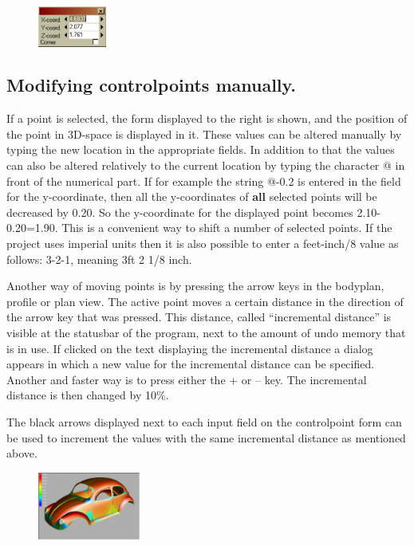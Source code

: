 \documentclass[12pt]{article}
\begin{document}
\begin{figure}
        \centering
        \includegraphics[width=0.2\textwidth,natwidth=277,natheight=165]{pointdialog.png}
        \caption{}
        \label{fig:pointdialog}
\end{figure}

\subsection{Modifying controlpoints manually.}
If a point is selected, the form displayed to the right is shown, and
the position of the point in 3D-space is displayed in it. These values
can be altered manually by typing the new location in the appropriate
fields. In addition to that the values can also be altered relatively
to the current location by typing the character @ in front of the
numerical part. If for example the string @-0.2 is entered in the
field for the y-coordinate, then all the y-coordinates of \textbf{all}
selected points will be decreased by 0.20. So the y-coordinate for the
displayed point becomes 2.10-0.20=1.90. This is a convenient way to
shift a number of selected points. If the project uses imperial units
then it is also possible to enter a feet-inch/8 value as follows:
3-2-1, meaning 3ft 2 1/8 inch.

Another way of moving points is by
pressing the arrow keys in the bodyplan, profile or plan view.  The
active point moves a certain distance in the direction of the arrow
key that was pressed. This distance, called “incremental distance” is
visible at the statusbar of the program, next to the amount of undo
memory that is in use. If clicked on the text displaying the
incremental distance a dialog appears in which a new value for the
incremental distance can be specified. Another and faster way is to
press either the + or – key. The incremental distance is then changed
by 10\%.

The black arrows displayed next to each input field on the
controlpoint form can be used to increment the values with the same
incremental distance as mentioned above.

\begin{figure}
        \centering
        \includegraphics[width=0.3\textwidth,natwidth=604,natheight=400]{surfacecurvaturevw.png}
        \caption{}
        \label{fig:surfcurvvw}
\end{figure}
\end{document}
